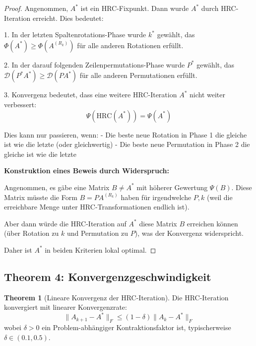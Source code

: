 \documentclass[a4paper,12pt]{article}
\theoremstyle{definition}
\newtheorem{theorem}{Theorem}
\begin{document}
\begin{proof}
Angenommen, $A^*$ ist ein HRC-Fixpunkt. Dann wurde $A^*$ durch HRC-Iteration erreicht. Dies bedeutet:

1. In der letzten Spaltenrotations-Phase wurde $k^*$ gewählt, das $\Phi(A^*) \geq \Phi(A^{(R_k)})$ für alle anderen Rotationen erfüllt.

2. In der darauf folgenden Zeilenpermutations-Phase wurde $P^*$ gewählt, das $\mathcal{D}(P^* A^*) \geq \mathcal{D}(P A^*)$ für alle anderen Permutationen erfüllt.

3. Konvergenz bedeutet, dass eine weitere HRC-Iteration $A^*$ nicht weiter verbessert:
\[
\Psi(\text{HRC}(A^*)) = \Psi(A^*)
\]

Dies kann nur passieren, wenn:
- Die beste neue Rotation in Phase 1 die gleiche ist wie die letzte (oder gleichwertig)
- Die beste neue Permutation in Phase 2 die gleiche ist wie die letzte

\textbf{Konstruktion eines Beweis durch Widerspruch:}

Angenommen, es gäbe eine Matrix $B \neq A^*$ mit höherer Gewertung $\Psi(B)$. Diese Matrix müsste die Form $B = P A^{(R_k)}$ haben für irgendwelche $P, k$ (weil die erreichbare Menge unter HRC-Transformationen endlich ist).

Aber dann würde die HRC-Iteration auf $A^*$ diese Matrix $B$ erreichen können (über Rotation zu $k$ und Permutation zu $P$), was der Konvergenz widerspricht.

Daher ist $A^*$ in beiden Kriterien lokal optimal.
\end{proof}

\subsection{Theorem 4: Konvergenzgeschwindigkeit}

\begin{theorem}[Lineare Konvergenz der HRC-Iteration]
\label{thm:convergence_rate}
Die HRC-Iteration konvergiert mit linearer Konvergenzrate:
\[
\|A_{k+1} - A^*\|_F \leq (1 - \delta) \|A_k - A^*\|_F
\]
wobei $\delta > 0$ ein Problem-abhängiger Kontraktionsfaktor ist, typischerweise $\delta \in (0.1, 0.5)$.
\end{theorem}
\end{document}
